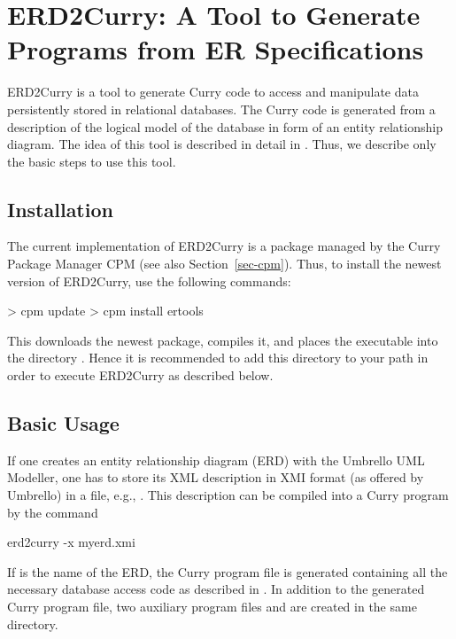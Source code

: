 \section{ERD2Curry: A Tool to Generate Programs from ER Specifications}
\label{sec-erd2curry}

ERD2Curry
is a tool to generate Curry code to access and manipulate data
persistently stored in relational databases.
The Curry code is generated from a description of the logical model
of the database in form of an
entity relationship diagram.
The idea of this tool is described in detail in
\cite{BrasselHanusMueller08PADL}.
Thus, we describe only the basic steps to use this tool.

\subsection{Installation}

The current implementation of ERD2Curry is a package
managed by the Curry Package Manager CPM
(see also Section~\ref{sec-cpm}).
Thus, to install the newest version of ERD2Curry, use the following commands:
%
\begin{curry}
> cpm update
> cpm install ertools
\end{curry}
%
This downloads the newest package, compiles it, and places
the executable  into the directory .
Hence it is recommended to add this directory to your path
in order to execute ERD2Curry as described below.

\subsection{Basic Usage}

If one creates an entity relationship diagram (ERD)
with the Umbrello UML Modeller, one has to store its
XML description in XMI format (as offered by Umbrello)
in a file, e.g., .
This description can be compiled into a Curry program by the
command
\begin{curry}
erd2curry -x myerd.xmi
\end{curry}
If  is the name of the ERD, the Curry program file
 is generated containing all the necessary
database access code as described in \cite{BrasselHanusMueller08PADL}.
In addition to the generated Curry program file,
two auxiliary program files
 and 
are created in the same directory.

